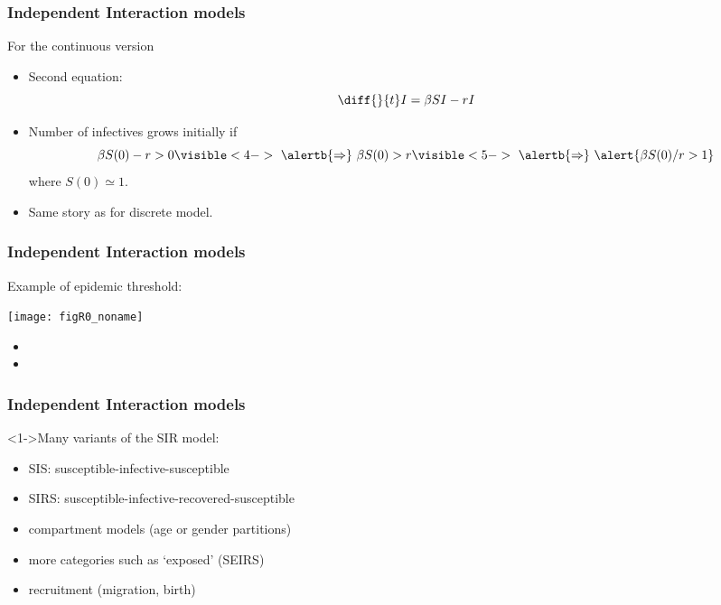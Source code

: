 \begin{frame}
  \frametitle{Independent Interaction models}

  \begin{block}{For the continuous version}
    \begin{itemize}
    \item<1-> Second equation:
      $$
      \diff{}{t} I = \beta S I - r I
      $$
    \item<3->
      Number of infectives grows initially if
      $$
      \beta S(0) - r > 0 
      \visible<4->{
      \  \alertb{\Rightarrow} \
        \beta S(0) > r
      }
      \visible<5->{
      \  \alertb{\Rightarrow} \
      \alert{\beta S(0)/r > 1}
      }
      $$
      where 
      $S(0) \simeq 1$.
    \item<6-> Same story as for discrete model.
    \end{itemize}
  \end{block}

\end{frame}


\begin{frame}
  \frametitle{Independent Interaction models}

  \centering 

  Example of epidemic threshold:

  \texttt{[image: figR0\_noname]}

  \begin{itemize}
  \item {}
  \item {}
  \end{itemize}

\end{frame}


\begin{frame}
  \frametitle{Independent Interaction models}

  \begin{block}<1->{Many variants of the SIR model:} 
    \begin{itemize}
    \item<2-> \alert{SIS}: susceptible-infective-susceptible 
    \item<3-> \alert{SIRS}: susceptible-infective-recovered-susceptible
    \item<4-> compartment models (age or gender partitions)
    \item<5-> more categories such as `exposed' (\alert{SEIRS})
    \item<6-> recruitment (migration, birth)
    \end{itemize}
  \end{block}

\end{frame}


